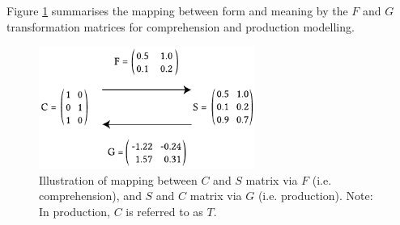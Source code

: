 Figure \ref{fig:3_1} summarises the mapping between form and meaning by the $F$ and $G$ transformation matrices for comprehension and production modelling.

\begin{figure}
    \centering
    \includegraphics[width=200pt]{figures/fig3.1.pdf}
    \caption{Illustration of mapping between $C$ and $S$ matrix via $F$ (i.e. comprehension), and $S$ and $C$ matrix via $G$ (i.e. production). Note: In production, $C$ is referred to as $T$.}
    \label{fig:3_1}
\end{figure}
